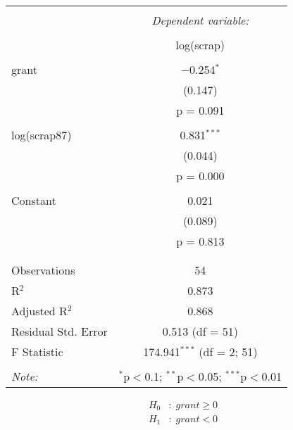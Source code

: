 \documentclass[
]{article}
\begin{document}
\begin{table}[!htbp] \centering 
  \caption{} 
  \label{} 
\begin{tabular}{@{\extracolsep{5pt}}lc} 
\\[-1.8ex]\hline 
\hline \\[-1.8ex] 
 & \multicolumn{1}{c}{\textit{Dependent variable:}} \\ 
\cline{2-2} 
\\[-1.8ex] & log(scrap) \\ 
\hline \\[-1.8ex] 
 grant & $-$0.254$^{*}$ \\ 
  & (0.147) \\ 
  & p = 0.091 \\ 
  & \\ 
 log(scrap87) & 0.831$^{***}$ \\ 
  & (0.044) \\ 
  & p = 0.000 \\ 
  & \\ 
 Constant & 0.021 \\ 
  & (0.089) \\ 
  & p = 0.813 \\ 
  & \\ 
\hline \\[-1.8ex] 
Observations & 54 \\ 
R$^{2}$ & 0.873 \\ 
Adjusted R$^{2}$ & 0.868 \\ 
Residual Std. Error & 0.513 (df = 51) \\ 
F Statistic & 174.941$^{***}$ (df = 2; 51) \\ 
\hline 
\hline \\[-1.8ex] 
\textit{Note:}  & \multicolumn{1}{r}{$^{*}$p$<$0.1; $^{**}$p$<$0.05; $^{***}$p$<$0.01} \\ 
\end{tabular} 
\end{table}

\[\begin{aligned}
H_0&: \; grant \geq 0 \\
H_1&: \; grant<0
\end{aligned}\]
\end{document}
